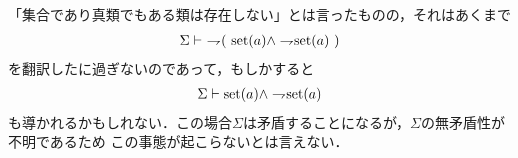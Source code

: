 	「集合であり真類でもある類は存在しない」とは言ったものの，それはあくまで
	\begin{align}
		\Sigma \vdash\ \rightharpoondown\hspace{-0.25em} (\ \operatorname*{set} (a) \wedge \rightharpoondown\hspace{-0.25em} \operatorname*{set} (a)\ )
	\end{align}
	を翻訳したに過ぎないのであって，もしかすると
	\begin{align}
		\Sigma \vdash \operatorname*{set} (a) \wedge \rightharpoondown\hspace{-0.25em} \operatorname*{set} (a)
	\end{align}
	も導かれるかもしれない．この場合$\Sigma$は矛盾することになるが，$\Sigma$の無矛盾性が不明であるため
	この事態が起こらないとは言えない．
	